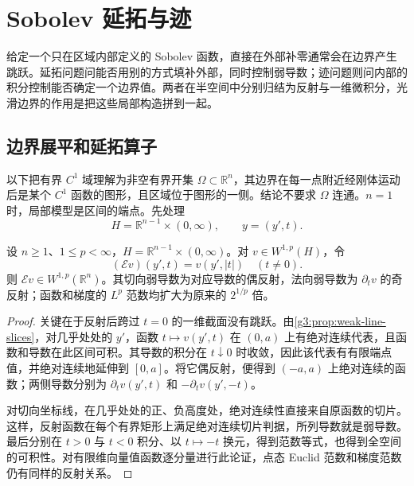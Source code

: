 
% 
% 
% 

\section{Sobolev 延拓与迹}
\label{g3:sec:1106}

给定一个只在区域内部定义的 Sobolev 函数，直接在外部补零通常会在边界产生跳跃。延拓问题问能否用别的方式填补外部，同时控制弱导数；迹问题则问内部的积分控制能否确定一个边界值。两者在半空间中分别归结为反射与一维微积分，光滑边界的作用是把这些局部构造拼到一起。

\subsection{边界展平和延拓算子}
\label{g3:subsec:1106:01}
以下把有界 \(C^1\) 域理解为非空有界开集 \(\Omega\subset\mathbb R^n\)，其边界在每一点附近经刚体运动后是某个 \(C^1\) 函数的图形，且区域位于图形的一侧。结论不要求 \(\Omega\) 连通。\(n=1\) 时，局部模型是区间的端点。先处理
\[
	H=\mathbb R^{n-1}\times(0,\infty),\qquad y=(y',t).
\]

\begin{lemma}\label{g3:lem:half-space-reflection}
	设 \(n\ge1\)、\(1\le p<\infty\)，\(H=\mathbb R^{n-1}\times(0,\infty)\)。对 \(v\in W^{1,p}(H)\)，令
	\[
		(\mathcal Ev)(y',t)=v(y',|t|)\quad(t\ne0).
	\]
	则 \(\mathcal Ev\in W^{1,p}(\mathbb R^n)\)。其切向弱导数为对应导数的偶反射，法向弱导数为 \(\partial_t v\) 的奇反射；函数和梯度的 \(L^p\) 范数均扩大为原来的 \(2^{1/p}\) 倍。
\end{lemma}
\begin{proof}
	关键在于反射后跨过 \(t=0\) 的一维截面没有跳跃。由\cref{g3:prop:weak-line-slices}，对几乎处处的 \(y'\)，函数 \(t\mapsto v(y',t)\) 在 \((0,a)\) 上有绝对连续代表，且函数和导数在此区间可积。其导数的积分在 \(t\downarrow0\) 时收敛，因此该代表有有限端点值，并绝对连续地延伸到 \([0,a]\)。将它偶反射，便得到 \((-a,a)\) 上绝对连续的函数；两侧导数分别为 \(\partial_t v(y',t)\) 和 \(-\partial_t v(y',-t)\)。

	对切向坐标线，在几乎处处的正、负高度处，绝对连续性直接来自原函数的切片。这样，反射函数在每个有界矩形上满足绝对连续切片判据，所列导数就是弱导数。最后分别在 \(t>0\) 与 \(t<0\) 积分、以 \(t\mapsto-t\) 换元，得到范数等式，也得到全空间的可积性。对有限维向量值函数逐分量进行此论证，点态 Euclid 范数和梯度范数仍有同样的反射关系。
\end{proof}

